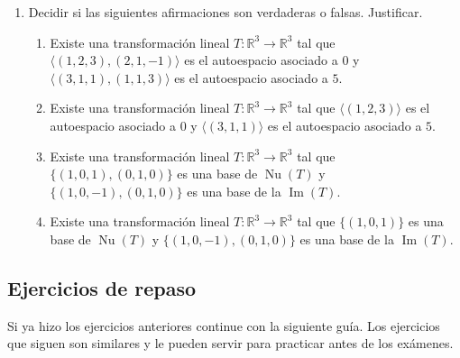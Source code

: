 \begin{enumerate}[topsep=6pt, itemsep=.4cm]
\item Decidir si las siguientes afirmaciones son verdaderas o falsas. Justificar. 
\begin{enumerate}
    \item\label{tl-V-o-F-a} Existe una transformación lineal $T:\mathbb{R}^3\longrightarrow\mathbb{R}^3$ tal que $\langle(1,2,3),(2,1,-1)\rangle$ es el autoespacio asociado a $0$ y $\langle(3,1,1),(1,1,3)\rangle$ es el autoespacio asociado a $5$.
    \item\label{tl-V-o-F-b} Existe una transformación lineal $T:\mathbb{R}^3\longrightarrow\mathbb{R}^3$ tal que $\langle(1,2,3)\rangle$ es el autoespacio asociado a $0$ y $\langle(3,1,1)\rangle$ es el autoespacio asociado a $5$.
    \item\label{tl-V-o-F-c} Existe una transformación lineal $T:\mathbb{R}^3\longrightarrow\mathbb{R}^3$ tal que $\{(1,0,1), (0,1,0)\}$ es una base de $\operatorname{Nu}(T)$ y  $\{(1,0,-1), (0,1,0)\}$ es una base de la $\operatorname{Im}(T)$.
    \item\label{tl-V-o-F-d} Existe una transformación lineal $T:\mathbb{R}^3\longrightarrow\mathbb{R}^3$ tal que $\{(1,0,1)\}$ es una base de $\operatorname{Nu}(T)$ y  $\{(1,0,-1), (0,1,0)\}$ es una base de la $\operatorname{Im}(T)$. 
\end{enumerate}

\end{enumerate}


\subsection*{Ejercicios de repaso}
Si ya hizo los ejercicios anteriores continue con la siguiente guía. Los ejercicios que siguen son similares y le pueden servir para practicar antes de los exámenes.

